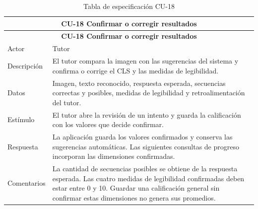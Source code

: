 \begin{longtable}{|p{4cm}|p{11cm}|}
\caption{Tabla de especificación CU-18}
\label{tab:cu18} \\

\hline
\multicolumn{2}{|c|}{\textbf{CU-18 Confirmar o corregir resultados}} \\
\hline
\endfirsthead

\hline
\multicolumn{2}{|c|}{\textbf{CU-18 Confirmar o corregir resultados}} \\
\hline
\endhead

\hline
\endfoot
\endlastfoot

Actor & Tutor \\
\hline

Descripción & El tutor compara la imagen con las sugerencias del sistema y confirma o corrige el CLS y las medidas de legibilidad. \\
\hline

Datos & Imagen, texto reconocido, respuesta esperada, secuencias correctas y posibles, medidas de legibilidad y retroalimentación del tutor. \\
\hline

Estímulo & El tutor abre la revisión de un intento y guarda la calificación con los valores que decide confirmar. \\
\hline

Respuesta & La aplicación guarda los valores confirmados y conserva las sugerencias automáticas. Las siguientes consultas de progreso incorporan las dimensiones confirmadas. \\
\hline

Comentarios & La cantidad de secuencias posibles se obtiene de la respuesta esperada. Las cuatro medidas de legibilidad confirmadas deben estar entre 0 y 10. Guardar una calificación general sin confirmar estas dimensiones no genera sus promedios. \\
\hline

\end{longtable}


